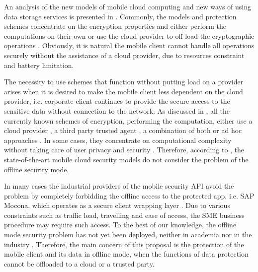 \documentclass[twocolumn]{svjour3}          	%
\begin{document}
An analysis of the new models of mobile cloud computing and new ways of using data storage services is presented in \cite{khan2015cloud, khan2013towards, mayrhofer2015architecture, chang2015design}. Commonly, the models and protection schemes concentrate on the encryption properties and either perform the computations on their own \cite{zhao2010trusted, yang2011provable} or use the cloud provider to off-load the cryptographic operations \cite{itani2010energy, ren2011lightweight}. Obviously, it is natural the mobile client cannot handle all operations securely without the assistance of a cloud provider, due to resources constraint and battery limitation.

The necessity to use schemes that function without putting load on a provider arises when it is desired to make the mobile client less dependent on the cloud provider, i.e. corporate client continues to provide the secure access to the sensitive data without connection to the network. As discussed in \cite{khan2015cloud}, all the currently known schemes of encryption, performing the computation, either use a cloud provider \cite{zhao2010trusted}, a third party trusted agent \cite{yang2011provable, heydari2016efficient}, a combination of both \cite{itani2010energy} or ad hoc approaches \cite{shila2016amcloud}. In some cases, they concentrate on computational complexity without taking care of user privacy and security \cite{ren2011lightweight}. Therefore, according to \cite{khan2013towards, khan2015cloud}, the state-of-the-art mobile cloud security models do not consider the problem of the offline security mode. 

In many cases the industrial providers of the mobile security API avoid the problem by completely forbidding the offline access to the protected app, i.e. SAP Mocona, which operates as a secure client wrapping layer \cite{Lelyveld2013}. Due to various constraints such as traffic load, travelling and ease of access, the SME business procedure may require such access. To the best of our knowledge, the offline mode security problem has not yet been deployed, neither in academia nor in the industry \cite{yovel2014, khan2015cloud, khan2014survey, khan2013towards}. Therefore, the main concern of this proposal is the protection of the mobile client and its data in offline mode, when the functions of data protection cannot be offloaded to a cloud or a trusted party. 
\end{document}
